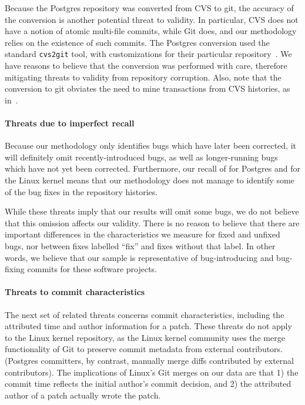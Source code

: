 Because the Postgres repository was converted from CVS to git, the
accuracy of the conversion is another potential threat to validity.  In
particular, CVS does not have a notion of atomic multi-file commits,
while Git does, and our methodology relies on the existence of such
commits. The Postgres conversion used the standard {\tt cvs2git} tool,
with customizations for their particular
repository~\cite{haas09:_so_why_postg_using_git}. We have reasons to
believe that the conversion was performed with care, therefore
mitigating threats to validity from repository corruption. 
Also, note that the conversion to git obviates the need to mine transactions
from CVS histories, as in~\cite{zimmermann-msr-2004}.

\paragraph{Threats due to imperfect recall}
Because our methodology only identifies bugs which have later been
corrected, it will definitely omit recently-introduced bugs, as well
as longer-running bugs which have not yet been corrected. Furthermore,
our recall of \postR for Postgres and \linuxR for the Linux kernel means
that our methodology does not manage to identify some of the bug fixes
in the repository histories.

While these threats imply that our results will omit some bugs, we do
not believe that this omission affects our validity. There is no
reason to believe that there are important differences in the
characteristics we measure for fixed and unfixed bugs, nor between
fixes labelled ``fix'' and fixes without that label. In other words,
we believe that our sample is representative of bug-introducing and
bug-fixing commits for these software projects.

\paragraph{Threats to commit characteristics}
The next set of related threats concerns commit characteristics,
including the attributed time and author information for a patch.
These threats do not apply to the Linux kernel repository, as the Linux
kernel community uses the merge functionality of Git to preserve
commit metadata from external contributors. (Postgres committers, by
contrast, manually merge diffs contributed by external contributors).
The implications of Linux's Git merges on our data are that 1) the commit
time reflects the initial author's commit decision, and 2) the
attributed author of a patch actually wrote the patch.

